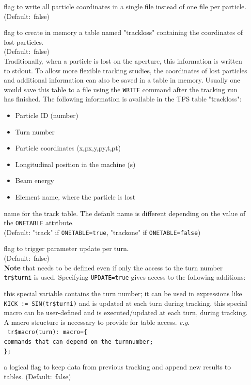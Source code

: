 \begin{madlist}
   flag to write all particle coordinates in a single
  file instead of one file per particle. \\ (Default:~false)

   flag to create in memory a table named "trackloss"
  containing the coordinates of lost particles.\\
  (Default:~false) \\
  Traditionally, when a particle is lost on the aperture, this information
  is written to stdout. To allow more flexible tracking studies, the
  coordinates of lost particles and additional information can also be
  saved in a table in memory. Usually one would save this table to a
  file using the \texttt{WRITE} command after the tracking run has
  finished. The following information is available in the TFS table
  "trackloss":          
  \begin{itemize}
  \item Particle ID (number)
  \item Turn number
  \item Particle coordinates (x,px,y,py,t,pt)
  \item Longitudinal position in the machine (s)
  \item Beam energy
  \item Element name, where the particle is lost
  \end{itemize}

   name for the track table. The default name is different
  depending on the value of the \texttt{ONETABLE} attribute. \\ 
  (Default: "track" if \texttt{ONETABLE=true}, "trackone" if \texttt{ONETABLE=false})

   flag to trigger parameter update per turn. \\  
  (Default:~false) \\
  \textbf{Note} that  needs to be defined even if only the access
  to the turn number \texttt{tr\$turni} is used.
  Specifying \texttt{UPDATE=true} gives access to the following additions:   
  \begin{madlist}
     this special variable contains the turn number;
    it can be used in expressions like \texttt{KICK := SIN(tr\$turni)} and is
    updated at each turn during tracking.     
      this special macro can be
    user-defined and is executed/updated at each turn, during tracking.
    A macro structure is necessary to provide for table access.
    \textsl{e.g.} \\ 
    \texttt{
      tr\$macro(turn): macro=\{ \\
      commands that can depend on the turnnumber;\\
      \};
    }

    a logical flag to keep data from previous tracking and append new results to tables. (Default:~false)

  \end{madlist}

\end{madlist}

